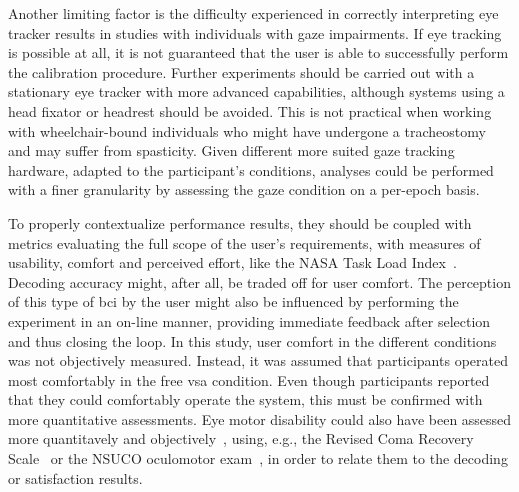 \documentclass{article}
\begin{document}
Another limiting factor is the difficulty experienced in correctly interpreting eye
tracker results in studies with individuals with gaze impairments.
If eye tracking is possible at all, it is not guaranteed that the user is able
to successfully perform the calibration procedure.
Further experiments should be carried out with a stationary eye tracker with
more advanced capabilities, although systems using a head fixator or headrest
should be avoided.
This is not practical when working with
wheelchair-bound individuals who might have undergone a tracheostomy and may
suffer from spasticity.
Given different more suited gaze tracking hardware, adapted to the participant's
conditions, analyses could be performed with a finer granularity by assessing
the gaze condition on a per-epoch basis.

To properly contextualize performance results, they should be coupled with
metrics evaluating the full scope of the user's requirements, with measures of
usability, comfort and perceived effort, like the NASA Task Load
Index~\cite{Hart2006}.
Decoding accuracy might, after all, be traded off for user comfort.
The perception of this type of \ac{bci} by the user might also be influenced by
performing the experiment in an on-line manner, providing immediate feedback
after selection and thus closing the loop.
In this study, user comfort in the different conditions was not objectively
measured.
Instead, it was assumed that participants operated most comfortably in the free
\ac{vsa} condition.
Even though participants reported that they could comfortably operate the
system, this must be confirmed with more quantitative assessments.
Eye motor disability could also have been assessed more quantitavely and
objectively~\cite{FriedOken2020}, using, e.g.,
the Revised Coma Recovery Scale~\cite{Giacino2004} or the NSUCO
oculomotor exam~\cite{Maples1992}, in order to relate them to the decoding or satisfaction results.

\end{document}
